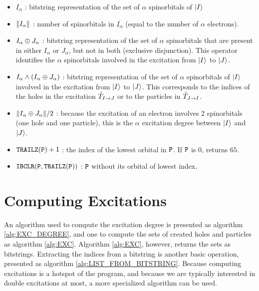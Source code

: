 \documentclass[./thesis.tex]{subfiles}
\begin{document}
\begin{itemize}
	      
	\item $I_{\alpha}$ : bitstring representation of the set of $\alpha$ spinorbitals of ${\ket{I}}$
	            
	\item $\norm{I_{\alpha}}$ : number of spinorbitals in $I_{\alpha}$ (equal to the number of $\alpha$ electrons).
	            
	\item $I_{\alpha} \oplus J_{\alpha}$ : bitstring representation of the set of $\alpha$ spinorbitals that are present in either $I_{\alpha}$ or $J_{\alpha}$, but not in both (exclusive disjunction).
        This operator identifies the $\alpha$ spinorbitals involved in the excitation from ${\ket{I}}$ to ${\ket{J}}$. 
	            
	\item $I_{\alpha} \wedge \qty(I_{\alpha} \oplus J_{\alpha})$ : 
        bitstring representation of the set of $\alpha$ spinorbitals of ${\ket{I}}$ involved in the excitation from ${\ket{I}}$ to ${\ket{J}}$. This corresponds to the indices of the holes in the excitation ${\hat{T}_{I \rightarrow J}}$ or to the particles in ${\hat{T}_{J \rightarrow I}}$. 
	            
	\item $\norm{I_{\alpha} \oplus J_{\alpha}}/2$ : because the excitation of an electron involves 2 spinorbitals (one hole and one particle), this is the $\alpha$ excitation degree between ${\ket{I}}$ and ${\ket{J}}$.
	            
	\item $\text{\texttt{TRAILZ}}({\texttt{P}})+1$ : the index of the lowest orbital in ${\texttt{P}}$. If ${\texttt{P}}$ is $0$, returns $65$.
	            
	\item $\text{\texttt{IBCLR}}({\texttt{P}},\text{\texttt{TRAILZ}}({\texttt{P}}))$ : ${\texttt{P}}$ without its orbital of lowest index.

\end{itemize}


\section{Computing Excitations}

An algorithm used to compute the excitation degree is presented as algorithm \ref{alg:EXC_DEGREE}, and one to compute the sets of created holes and particles as algorithm \ref{alg:EXC}. Algorithm \ref{alg:EXC}, however, returns the sets as bitstrings. Extracting the indices from a bitstring is another basic operation, presented as algorithm \ref{alg:LIST_FROM_BITSTRING}.
Because computing excitations is a hotspot of the program, and because we are typically interested in double excitations at most, a more specialized algorithm can be used.\cite{Scemama_2013}
\end{document}
